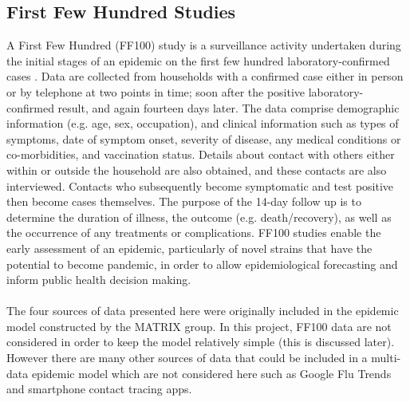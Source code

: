 \subsection{First Few Hundred Studies}
A First Few Hundred (FF100) study is a surveillance activity undertaken during the initial stages of an epidemic on the first few hundred laboratory-confirmed cases \cite{Mclean et al 2010}.
Data are collected from households with a confirmed case either in person or by telephone at two points in time; soon after the positive laboratory-confirmed result, and again fourteen days later.
The data comprise demographic information (e.g. age, sex, occupation), and clinical information such as types of symptoms, date of symptom onset, severity of disease, any medical conditions or co-morbidities, and vaccination status.
Details about contact with others either within or outside the household are also obtained, and these contacts are also interviewed. Contacts who subsequently become symptomatic and test positive then become cases themselves.
The purpose of the 14-day follow up is to determine the duration of illness, the outcome (e.g. death/recovery), as well as the occurrence of any treatments or complications.
FF100 studies enable the early assessment of an epidemic, particularly of novel strains that have the potential to become pandemic, in order to allow epidemiological forecasting and inform public health decision making.
\\ \\
The four sources of data presented here were originally included in the epidemic model constructed by the MATRIX group. In this project, FF100 data are not considered in order to keep the model relatively simple (this is discussed later).
However there are many other sources of data that could be included in a multi-data epidemic model which are not considered here such as Google Flu Trends and smartphone contact tracing apps.

